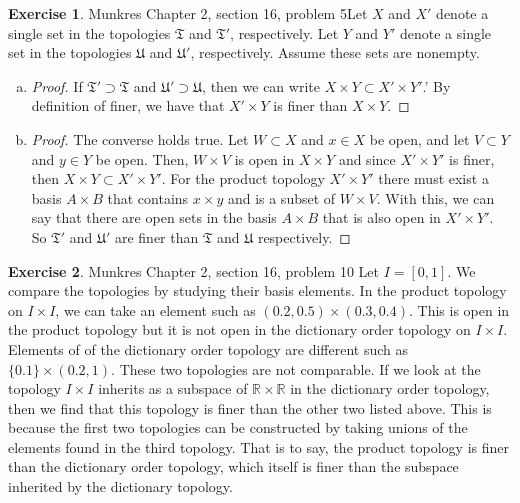 \documentclass[12pt]{article}
\theoremstyle{definition}
\newtheorem{exercise}{Exercise}
\begin{document}
\begin{exercise} Munkres Chapter 2, section 16, problem 5\newline Let $X$ and $X'$ denote a
	single set in the topologies $\mathfrak{T}$ and $\mathfrak{T}'$, respectively. Let $Y$ and $Y'$ denote a single set in the topologies $\mathfrak{U}$ and $\mathfrak{U}'$, respectively. Assume these sets are nonempty. 
\begin{enumerate}[(a)]
	\item \begin{proof}
		If $\mathfrak{T}'\supset \mathfrak{T}$ and $\mathfrak{U}'\supset \mathfrak{U}$, then we can write $X\times Y\subset X'\times Y'$.' By definition of finer, we have that $X'\times Y$ is finer than $X\times Y$.
	\end{proof}
	\item \begin{proof}
		The converse holds true. Let $W\subset X$ and $x\in X$ be open, and let $V\subset Y$ and $y\in Y$ be open. Then, $W\times V$ is open in $X\times Y$ and since $X'\times Y'$ is finer, then $X\times Y\subset X'\times Y'$. For the product topology $X'\times Y'$ there must exist a basis $A\times B$ that contains $x\times y$ and is a subset of $W\times V$. With this, we can say that there are open sets in the basis $A\times B$ that is also open in $X'\times Y'$. So $\mathfrak{T}'$ and $\mathfrak{U}'$ are finer than $\mathfrak{T}$ and $\mathfrak{U}$ respectively.
	\end{proof}
\end{enumerate} 
\end{exercise}

\begin{exercise} Munkres Chapter 2, section 16, problem 10 \newline Let $I=[0,1]$. We
    compare the topologies by studying their basis elements. In the product topology on $I\times I$, we can take an element such as $(0.2,0.5)\times(0.3,0.4)$. This is open in the product topology but it is not open in the dictionary order topology on $I\times I$. Elements of of the dictionary order topology are different such as $\{0.1\}\times (0.2,1)$. These two topologies are not comparable. If we look at the topology $I\times I$ inherits as a subspace of $\mathbb{R}\times \mathbb{R}$ in the dictionary order topology, then we find that this topology is finer than the other two listed above. This is because the first two topologies can be constructed by taking unions of the elements found in the third topology. That is to say, the product topology is finer than the dictionary order topology, which itself is finer than the subspace inherited by the dictionary topology. 
\end{exercise}
\end{document}

